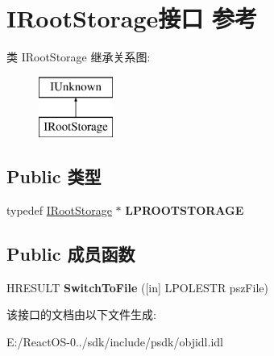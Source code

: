 \hypertarget{interface_i_root_storage}{}\section{I\+Root\+Storage接口 参考}
\label{interface_i_root_storage}
类 I\+Root\+Storage 继承关系图\+:\begin{figure}[H]
\begin{center}
\leavevmode
\includegraphics[height=2.000000cm]{interface_i_root_storage}
\end{center}
\end{figure}
\subsection*{Public 类型}
\begin{DoxyCompactItemize}
\item 
\mbox{\label{interface_i_root_storage_a0495361f8528d0b633743f01a45a1b8e}} 
typedef \hyperlink{interface_i_root_storage}{I\+Root\+Storage} $\ast$ {\bfseries L\+P\+R\+O\+O\+T\+S\+T\+O\+R\+A\+GE}
\end{DoxyCompactItemize}
\subsection*{Public 成员函数}
\begin{DoxyCompactItemize}
\item 
\mbox{\label{interface_i_root_storage_afcbb44cbec915724bb313a8b4dce2740}} 
H\+R\+E\+S\+U\+LT {\bfseries Switch\+To\+File} (\mbox{[}in\mbox{]} L\+P\+O\+L\+E\+S\+TR psz\+File)
\end{DoxyCompactItemize}


该接口的文档由以下文件生成\+:\begin{DoxyCompactItemize}
\item 
E\+:/\+React\+O\+S-\/0../sdk/include/psdk/objidl.\+idl\end{DoxyCompactItemize}
